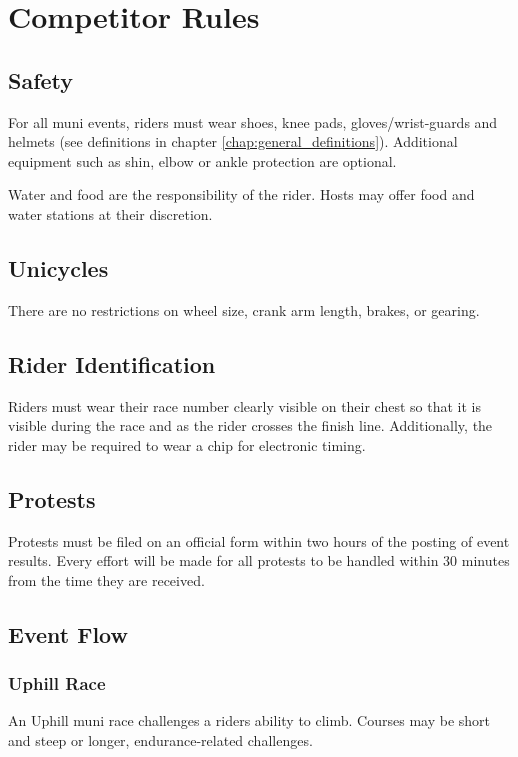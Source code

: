 \chapter{Competitor Rules}

\section{Safety}
For all muni events, riders must wear shoes, knee pads, gloves/wrist-guards and helmets (see definitions in chapter \ref{chap:general_definitions}). Additional equipment such as shin, elbow or ankle protection are optional.

Water and food are the responsibility of the rider. Hosts may offer food and water stations at their discretion.

\section{Unicycles}

There are no restrictions on wheel size, crank arm length, brakes, or gearing.

\section{Rider Identification}

Riders must wear their race number clearly visible on their chest so that it is visible during the race and as the rider crosses the finish line.
Additionally, the rider may be required to wear a chip for electronic timing.

\section{Protests}

Protests must be filed on an official form within two hours of the posting of event results.
Every effort will be made for all protests to be handled within 30 minutes from the time they are received.

\section{Event Flow}

\subsection{Uphill Race \label{sec:muni_uphill}}

An Uphill muni race challenges a riders ability to climb.
Courses may be short and steep or longer, endurance-related challenges. 

